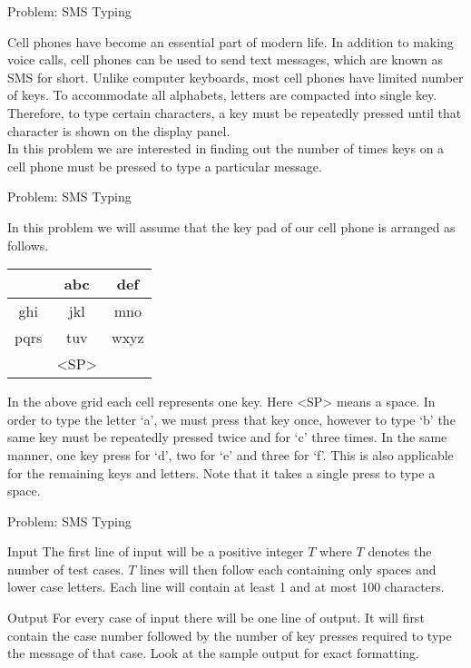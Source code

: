 \documentclass[10pt]{beamer}
\begin{document}
\begin{frame}{Problem: SMS Typing}

{\small
   Cell phones have become an essential part of modern life. In addition to
making voice calls, cell phones can be used to send text messages, which
are known as SMS for short. Unlike computer keyboards, most cell phones
have limited number of keys. To accommodate all alphabets, letters are
compacted into single key. Therefore, to type certain characters, a key
must be repeatedly pressed until that character is shown on the display
panel.\\
\vspace{10pt}
In this problem we are interested in finding out the number of times keys on a cell phone must be
pressed to type a particular message.
}
\end{frame}


\begin{frame}{Problem: SMS Typing}

{
    \small
In this problem we will assume that the key pad of our cell phone is arranged as follows.

\begin{center}
    \begin{tabular}{|c|c|c|}
        \hline
         & abc & def \\
        \hline
        ghi & jkl & mno \\
        \hline
        pqrs & tuv & wxyz \\
        \hline
         & <SP> & \\
        \hline
    \end{tabular}
\end{center}

In the above grid each cell represents one key. Here <SP> means a space. In order to type the letter
‘a’, we must press that key once, however to type ‘b’ the same key must be repeatedly pressed twice
and for ‘c’ three times. In the same manner, one key press for ‘d’, two for ‘e’ and three for ‘f’. This is
also applicable for the remaining keys and letters. Note that it takes a single press to type a space.
}

\end{frame}

\begin{frame}{Problem: SMS Typing}
    \begin{block}{Input}
    {\small
The first line of input will be a positive integer $T$ where $T$ denotes the number of test cases. $T$ lines
will then follow each containing only spaces and lower case letters. Each line will contain at least 1 and
at most 100 characters.
    }
    \end{block}

    \vspace{20pt}
    \begin{block}{Output}
    {\small
For every case of input there will be one line of output. It will first contain the case number followed
by the number of key presses required to type the message of that case. Look at the sample output for
exact formatting.
    }
    \end{block}
\end{frame}
\end{document}
